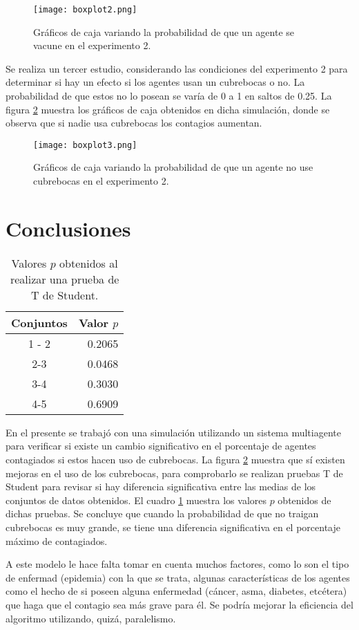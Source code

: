\documentclass[final,6p,times,twocolumn]{elsarticle}
\begin{document}
\begin{figure}
\label{conmasc1}
\centering
\texttt{[image: boxplot2.png]}
\caption{Gráficos de caja variando la probabilidad de que un agente se vacune en el experimento 2.}
\end{figure}

Se realiza un tercer estudio, considerando las condiciones del experimento 2 para determinar si hay un efecto si los agentes usan un cubrebocas o no. La probabilidad de que estos no lo posean se varía de 0 a 1 en saltos de 0.25. La figura \ref{conmasc2} muestra los gráficos de caja obtenidos en dicha simulación, donde se observa que si nadie usa cubrebocas los contagios aumentan.
\begin{figure}
\label{conmasc2}
\centering
\texttt{[image: boxplot3.png]}
\caption{Gráficos de caja variando la probabilidad de que un agente no use cubrebocas en el experimento 2.}
\end{figure}
\section{Conclusiones}
\begin{table}
\centering
\label{pvalue}
\caption{Valores $p$ obtenidos al realizar una prueba de T de Student.}
\begin{tabular}{|c|r|}
\hline 
Conjuntos & Valor $p$ \\ 
\hline 
1 - 2 & 0.2065 \\ 
\hline 
2-3 & 0.0468 \\ 
\hline 
3-4 & 0.3030 \\ 
\hline 
4-5 & 0.6909 \\ 
\hline 
\end{tabular} 
\end{table}
En el presente se trabajó con una simulación utilizando un sistema multiagente para verificar si existe un cambio significativo en el porcentaje de agentes contagiados si estos hacen uso de cubrebocas. La figura \ref{conmasc2} muestra que sí existen mejoras en el uso de los cubrebocas, para comprobarlo se realizan pruebas T de Student para revisar si hay diferencia significativa entre las medias de los conjuntos de datos obtenidos. El cuadro \ref{pvalue} muestra los valores $p$ obtenidos de dichas pruebas. Se concluye que cuando la probabilidad de que no traigan cubrebocas es muy grande, se tiene una diferencia significativa en el porcentaje máximo de contagiados.

A este modelo le hace falta tomar en cuenta muchos factores, como lo son el tipo de enfermad (epidemia) con la que se trata, algunas características de los agentes como el hecho de si poseen alguna enfermedad (cáncer, asma, diabetes, etcétera) que haga que el contagio sea más grave para él. Se podría mejorar la eficiencia del algoritmo utilizando, quizá, paralelismo. 
\end{document}
